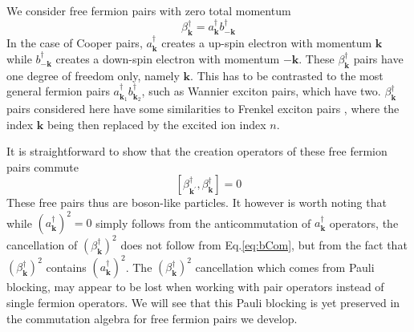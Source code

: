 \documentclass[epj]{svjour}
\newcommand{\vk}{\ensuremath{\mathbf{k}}}
\begin{document}
We consider free fermion pairs with zero total
momentum 
\begin{equation}
\beta^{\dagger}_\vk=a^{\dagger}_{\mathbf{k} }b^{\dagger}_{-\mathbf{k} }
\end{equation}
 In the case of Cooper pairs, $a^{\dagger}_{\mathbf{k} }$ creates a  up-spin electron with momentum $\mathbf{k}$ while $b^{\dagger}_{\mathbf{-k} }$ creates a down-spin electron with momentum $\mathbf{-k}$. These $\beta^{\dagger}_\vk$ pairs have one degree of freedom
only, namely $\mathbf{k}$. This has to be  contrasted to the
most general fermion pairs $a^{\dagger}_{\mathbf{k} _1}b^{\dagger}_{\mathbf{k%
} _2}$, such as Wannier exciton pairs, which have two. $\beta^{\dagger}_\vk$ pairs  considered here have  some similarities to Frenkel exciton pairs \cite{frenkel}, where the index $\mathbf{k}$ being then replaced by the excited ion index $n$. 

It is straightforward to show that the creation operators of these free fermion pairs commute 
\begin{equation}  \label{eq:bCom}
\left[\beta^{\dagger}_{\mathbf{k} ^{\prime}},\beta^{\dagger}_{\mathbf{k} }%
\right]  =0
\end{equation}
These free pairs thus are boson-like  particles.  It however is worth noting that while ${(a^{\dagger}_{\mathbf{k}})} ^2=0$
simply follows from the anticommutation of $a^{\dagger}_{\mathbf{k} }$
operators, the cancellation of ${(\beta^{\dagger}_{\mathbf{k}})} ^2$ does not follow from Eq.\eqref{eq:bCom}, but from the fact that ${(\beta^{\dagger}_{\mathbf{k}})} ^2$  contains ${(a^{\dagger}_{\mathbf{k}})} ^2$. The ${(\beta^{\dagger}_{\mathbf{k}})} ^2$  cancellation which comes from Pauli blocking, may appear  to be lost
when working with pair operators instead of  single fermion operators. We will see that this Pauli blocking is yet preserved in the commutation algebra for
free fermion pairs we develop.
\end{document}
